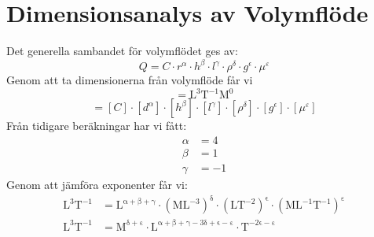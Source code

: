 \documentclass[a4paper,12pt]{article}
\begin{document}
\section{Dimensionsanalys av Volymflöde}
Det generella sambandet för volymflödet ges av:
\begin{equation}
    Q = C \cdot r^\alpha \cdot h^\beta \cdot l^\gamma \cdot \rho^\delta \cdot g^\epsilon \cdot \mu^\varepsilon
    \label{eq:general_flow}
\end{equation}
%
%
Genom att ta dimensionerna från volymflöde får vi
\begin{equation}
    [Q] = \mathrm{L^3T^{-1}M^0}
    \label{eq:dim_Q}
\end{equation}
%
\begin{equation}
    [Q] = [C] \cdot [d^\alpha] \cdot [h^\beta] \cdot [l^\gamma] \cdot [\rho^\delta] \cdot [g^\epsilon] \cdot [\mu^\varepsilon]
    \label{eq:dim_analysis}
\end{equation}
%
Från tidigare beräkningar har vi fått:
\begin{align}
    \alpha &= 4 \label{eq:alpha} \\
    \beta &= 1 \label{eq:beta} \\
    \gamma &= -1 \label{eq:gamma}
\end{align}
%
Genom att jämföra exponenter får vi:
\begin{align}
    \mathrm{L^3T^{-1}} &= \mathrm{L^{\alpha + \beta + \gamma}} \cdot 
    \mathrm{(ML^{-3})^\delta} \cdot \mathrm{(LT^{-2})^\epsilon} \cdot 
    \mathrm{(ML^{-1}T^{-1})^\varepsilon} \\
    \mathrm{L^3T^{-1}} &= \mathrm{M^{\delta + \varepsilon}} \cdot 
    \mathrm{L^{\alpha + \beta + \gamma - 3\delta + \epsilon - \varepsilon}} \cdot 
    \mathrm{T^{-2\epsilon - \varepsilon}}
\end{align}
\end{document}
